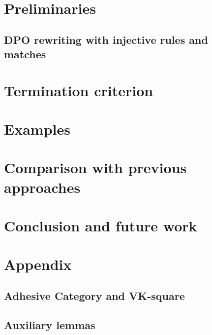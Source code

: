 \documentclass{report}
\begin{document}
\section{Preliminaries} 
\label{subgraph_counting:sec:pre} 
\subsection{DPO rewriting with injective rules and matches} 


 
  
\section{Termination criterion}
\label{subgraph_counting:sec:termination} 

 

\section{Examples} 
\label{subgraph_counting:sec:examples}


  
\section{Comparison with previous approaches}
\label{subgraph_counting:sec:related_work} 


\section{Conclusion and future work}
\label{subgraph_counting:sec:conclusion} 


\section{Appendix}
\label{subgraph_counting:sec:appendix}
\subsection*{Adhesive Category and VK-square}

\subsection*{Auxiliary lemmas}

\end{document}
